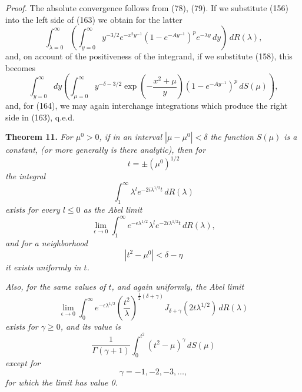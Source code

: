 \documentclass[12pt]{article}
\begin{document}
\medskip

\noindent\emph{Proof.} The absolute convergence follows from (78), (79). If we substitute (156) into the left side of (163) we obtain for the latter
\[
\int_{\lambda=0}^{\infty} \left( \int_{y=0}^{\infty} y^{-3/2} e^{-x^2 y^{-1}} (1 - e^{-Ay^{-1}})^p e^{-\lambda y} \, dy \right) \, dR(\lambda),
\]
and, on account of the positiveness of the integrand, if we substitute (158), this becomes
\[
\int_{y=0}^{\infty} dy \left( \int_{\mu=0}^{\infty} y^{-\delta-3/2} \exp\left(-\frac{x^2 + \mu}{y}\right) (1 - e^{-Ay^{-1}})^p \, dS(\mu) \right),
\]
and, for (164), we may again interchange integrations which produce the right side in (163), q.e.d.

\medskip

\noindent\textbf{Theorem 11.} \emph{For \(\mu^0 > 0\), if in an interval \(|\mu - \mu^0| < \delta\) the function \(S(\mu)\) is a constant, (or more generally is there analytic), then for}
\begin{equation}
t = \pm(\mu^0)^{1/2}
\tag{165}
\end{equation}
\emph{the integral}
\begin{equation}
\int_1^{\infty} \lambda^l e^{-2i\lambda^{1/2}t} \, dR(\lambda)
\tag{166}
\end{equation}
\emph{exists for every \(l \le 0\) as the Abel limit}
\begin{equation}
\lim_{\epsilon \to 0} \int_1^{\infty} e^{-\epsilon\lambda^{1/2}} \lambda^l e^{-2i\lambda^{1/2}t} \, dR(\lambda),
\tag{167}
\end{equation}
\emph{and for a neighborhood}
\begin{equation}
|t^2 - \mu^0| < \delta - \eta
\tag{168}
\end{equation}
\emph{it exists uniformly in \(t\).}

\emph{Also, for the same values of \(t\), and again uniformly, the Abel limit}
\begin{equation}
\lim_{\epsilon \to 0} \int_0^{\infty} e^{-\epsilon\lambda^{1/2}} \left( \frac{t^2}{\lambda} \right)^{\frac{1}{2}(\delta+\gamma)} J_{\delta+\gamma}(2t\lambda^{1/2}) \, dR(\lambda)
\tag{169}
\end{equation}
\emph{exists for \(\gamma \ge 0\), and its value is}
\begin{equation}
\frac{1}{\Gamma(\gamma + 1)} \int_0^{t^2} (t^2 - \mu)^\gamma \, dS(\mu)
\tag{170}
\end{equation}
\emph{except for}
\begin{equation}
\gamma = -1, -2, -3, \dots,
\tag{171}
\end{equation}
\emph{for which the limit has value 0.}
\end{document}
